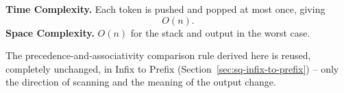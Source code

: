 \begin{complexitybox}
\textbf{Time Complexity.} Each token is pushed and popped at most once,
giving
\[
  O(n).
\]
\textbf{Space Complexity.} $O(n)$ for the stack and output in the worst
case.
\end{complexitybox}

\begin{takeawaybox}
The precedence-and-associativity comparison rule derived here is reused,
completely unchanged, in Infix to Prefix
(Section~\ref{sec:sq-infix-to-prefix}) -- only the direction of scanning
and the meaning of the output change.
\end{takeawaybox}
